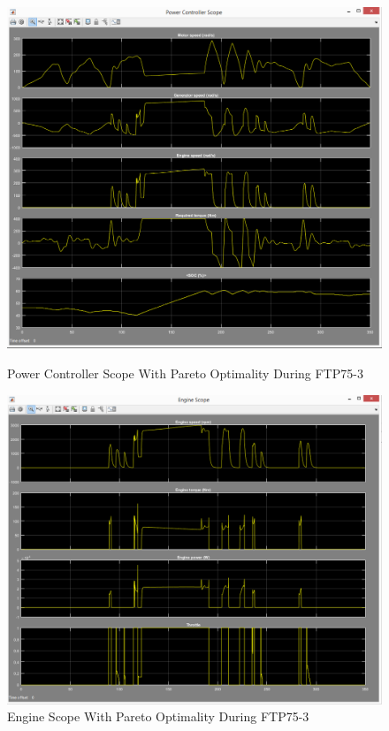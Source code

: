 \begin{figure}[hp]
\centering
\includegraphics[scale=0.48]{figures/Pareto/FTP75-3/powerController08Juni}
\caption{Power Controller Scope With Pareto Optimality During FTP75-3}
\label{fig:pcpo3}
\includegraphics[scale=0.47]{figures/Pareto/FTP75-3/engine08Juni}
\caption{Engine Scope With Pareto Optimality During FTP75-3}
\label{fig:epo3}
\end{figure}


